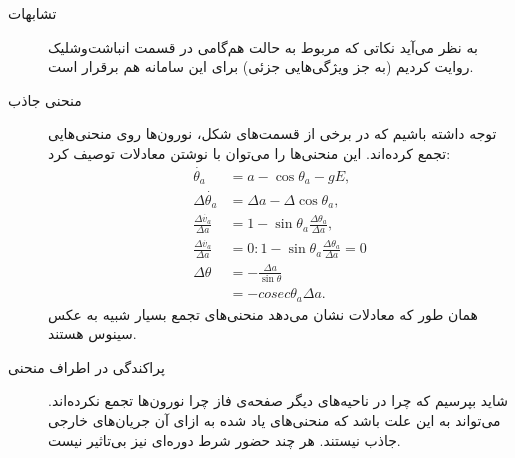 \begin{description}
	\item[تشابهات]
	به نظر می‌آید نکاتی که مربوط به حالت هم‌گامی در قسمت انباشت‌وشلیک روایت کردیم (به جز ویژگی‌هایی جزئی) برای این سامانه هم برقرار است. 
	\item[منحنی جاذب] 
	توجه داشته باشیم که در برخی از قسمت‌های شکل، نورون‌ها روی منحنی‌هایی تجمع کرده‌اند. این منحنی‌ها را می‌توان با نوشتن معادلات توصیف کرد:
	 \begin{align}
		\dot{\theta_a} &= a - \cos\theta_a - g E ,\\
		\Delta\dot{\theta_a} &= \Delta a - \Delta \cos\theta_a ,\\
		\frac{\Delta\dot{v_a}}{\Delta a} &= 1 - \sin\theta_a\frac{\Delta \theta_a}{\Delta a},\\
		\frac{\Delta\dot{v_a}}{\Delta a} &= 0 : 1 - \sin\theta_a\frac{\Delta \theta_a}{\Delta a} = 0\\
		\Delta \theta &= - \frac{\Delta a}{\sin\theta}\\
		&= - cosec \theta_a \Delta a.
	\end{align}
همان طور که معادلات نشان می‌دهد منحنی‌های تجمع بسیار شبیه به عکس سینوس هستند. 
	\item[پراکندگی در اطراف منحنی]
	شاید بپرسیم که چرا در ناحیه‌های دیگر صفحه‌ی فاز چرا نورون‌ها تجمع نکرده‌اند. می‌تواند به این علت باشد که منحنی‌های یاد شده به ازای آن جریان‌های خارجی جاذب نیستند. هر چند حضور شرط دوره‌ای نیز بی‌تاثیر نیست.
\end{description}


